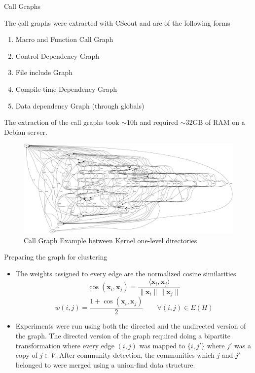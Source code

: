 \documentclass{beamer}
\renewcommand{\vec}{\mathbf}
\begin{document}
\begin{frame}[allowframebreaks]{Call Graphs}

The call graphs were extracted with CScout \cite{cscout} and are of the following forms

\begin{enumerate}
    \item Macro and Function Call Graph
    \item Control Dependency Graph 
    \item File include Graph
    \item Compile-time Dependency Graph
    \item Data dependency Graph (through globals)
    
\end{enumerate}

The extraction of the call graphs took $\sim 10$h and required $\sim 32$GB of RAM on a Debian server. 

\framebreak

\begin{figure}
    \centering
    \includegraphics[keepaspectratio,width=0.9\paperwidth,                          height=\paperheight]{call_graph.png}
    \caption{Call Graph Example between Kernel one-level directories}
    \label{fig:my_label}
\end{figure}


\end{frame}

\begin{frame}{Preparing the graph for clustering}

\begin{itemize}
    \item The weights assigned to every edge are the normalized cosine similarities
    $$\cos(\vec x_i, \vec x_j) = \frac {\langle \vec x_i, \vec x_j \rangle} {\| \vec x_i \| \| \vec x_j \|}$$
    $$w(i, j) = \frac {1 + \cos(\vec x_i, \vec x_j)} {2} \qquad \forall (i, j) \in E(H)$$
    
    \item Experiments were run using both the directed and the undirected version of the graph. The directed version of the graph required doing a bipartite transformation \cite{malliaros} where every edge $(i, j)$ was mapped to $\{ i, j' \}$ where $j'$ was a copy of $j \in V$. After community detection, the communities which $j$ and $j'$ belonged to were merged using a union-find data structure.  
    
\end{itemize}

\end{frame}
\end{document}
